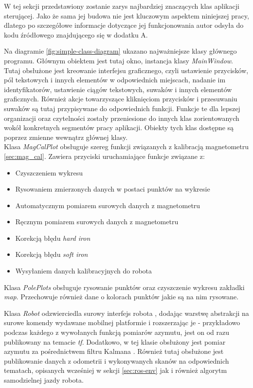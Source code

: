 W tej sekcji przedstawiony zostanie zarys najbardziej znaczących klas aplikacji sterującej. Jako że sama jej budowa nie jest kluczowym aspektem niniejszej pracy, dlatego po szczegółowe informacje dotyczące jej funkcjonowania autor odsyła do kodu źródłowego znajdującego się w dodatku A.

Na diagramie \ref{fig:simple-class-diagram} ukazano najważniejsze klasy głównego programu. Głównym obiektem jest tutaj okno, instancja klasy \emph{MainWindow}. Tutaj obsłużone jest kreowanie interfejsu graficznego, czyli ustawienie przycisków, pól tekstowych i innych elementów w odpowiednich miejscach, nadanie im identyfikatorów, ustawienie ciągów tekstowych, suwaków i innych elementów graficznych. Również akcje towarzyszące kliknięciom przycisków i przesuwaniu suwaków są tutaj przypisywane do odpowiednich funkcji. Funkcje te dla lepszej organizacji oraz czytelności zostały przeniesione do innych klas zorientowanych wokół konkretnych segmentów pracy aplikacji. Obiekty tych klas dostępne są poprzez zmienne wewnątrz głównej klasy.
\\

Klasa \emph{MagCalPlot} obsługuje szereg funkcji związanych z kalibracją magnetometru \ref{sec:mag_cal}. Zawiera przyciski uruchamiające funkcje związane z:
\begin{itemize}
    \item Czyszczeniem wykresu
    \item Rysowaniem zmierzonych danych w postaci punktów na wykresie
    \item Automatycznym pomiarem surowych danych z magnetometru
    \item Ręcznym pomiarem surowych danych z magnetometru
    \item Korekcją błędu \emph{hard iron} \cite{hard-iron} \cite{hard-soft-iron}
    \item Korekcją błędu \emph{soft iron} \cite{hard-soft-iron}
    \item Wysyłaniem danych kalibracyjnych do robota
\end{itemize}

Klasa \emph{PolePlots} obsługuje rysowanie punktów oraz czyszczenie wykresu zakładki \emph{map}. Przechowuje również dane o kolorach punktów jakie są na nim rysowane.

Klasa \emph{Robot} odzwierciedla surowy interfejs robota \label{sec:firmware}, dodając warstwę abstrakcji na surowe komendy wydawane mobilnej platformie i rozszerzając je - przykładowo podczas każdego z wywołanych funkcją pomiarów azymutu, jest on od razu publikowany na temacie \emph{tf}. Dodatkowo, w tej klasie obsłużony jest pomiar azymutu za pośrednictwem filtru Kalmana \cite{Kedzierski2016}. Również tutaj obsłużone jest publikowanie danych z odometrii i wykonywanych skanów na odpowiednich tematach, opisanych wcześniej w sekcji \ref{sec:ros-env} jak i również algorytm samodzielnej jazdy robota.

